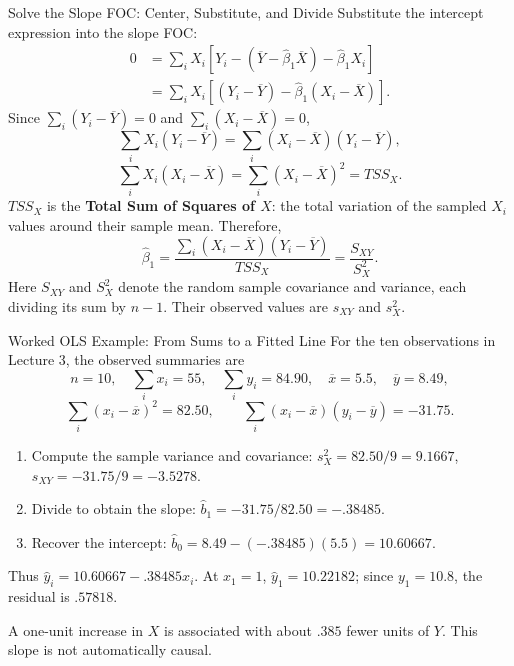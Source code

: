 \documentclass[10pt,aspectratio=169]{beamer}
\begin{document}
\begin{frame}{Solve the Slope FOC: Center, Substitute, and Divide}
\small
Substitute the intercept expression into the slope FOC:
\begin{align*}
0&=\sum_iX_i[Y_i-(\overline Y-\widehat\beta_1\overline X)-\widehat\beta_1X_i]\\
 &=\sum_iX_i[(Y_i-\overline Y)-\widehat\beta_1(X_i-\overline X)].
\end{align*}
Since $\sum_i(Y_i-\overline Y)=0$ and $\sum_i(X_i-\overline X)=0$,
\[
\sum_iX_i(Y_i-\overline Y)
=\sum_i(X_i-\overline X)(Y_i-\overline Y),
\]
\[
\sum_iX_i(X_i-\overline X)=\sum_i(X_i-\overline X)^2=TSS_X.
\]
$TSS_X$ is the \textbf{Total Sum of Squares of $X$}: the total variation of the sampled $X_i$ values around their sample mean.
Therefore,
\[
\boxed{\widehat\beta_1=
\frac{\sum_i(X_i-\overline X)(Y_i-\overline Y)}{TSS_X}
=\frac{S_{XY}}{S_X^2}}.
\]
Here $S_{XY}$ and $S_X^2$ denote the random sample covariance and variance, each dividing its sum by $n-1$. Their observed values are $s_{XY}$ and $s_X^2$.
\end{frame}

\begin{frame}{Worked OLS Example: From Sums to a Fitted Line}
\small
For the ten observations in Lecture 3, the observed summaries are
\[
n=10,\quad \sum_i x_i=55,\quad \sum_i y_i=84.90,
\quad \overline x=5.5,\quad \overline y=8.49,
\]
\[
\sum_i(x_i-\overline x)^2=82.50,\qquad
\sum_i(x_i-\overline x)(y_i-\overline y)=-31.75.
\]
\begin{enumerate}
\item Compute the sample variance and covariance:
$s_X^2=82.50/9=9.1667$, $s_{XY}=-31.75/9=-3.5278$.
\item Divide to obtain the slope:
$\widehat b_1=-31.75/82.50=-.38485$.
\item Recover the intercept:
$\widehat b_0=8.49-(-.38485)(5.5)=10.60667$.
\end{enumerate}
Thus $\widehat y_i=10.60667-.38485x_i$.
At $x_1=1$, $\widehat y_1=10.22182$; since $y_1=10.8$, the residual is $.57818$.
\par\medskip
A one-unit increase in $X$ is associated with about $.385$ fewer units of $Y$. This slope is not automatically causal.
\end{frame}
\end{document}
